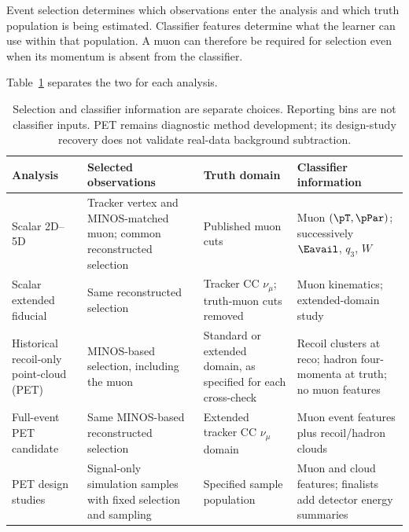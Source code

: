 Event selection determines which observations enter the analysis and which truth population is being estimated. Classifier features determine what the learner can use within that population. A muon can therefore be required for selection even when its momentum is absent from the classifier.

Table~\ref{tab:selection-features} separates the two for each analysis.

\begin{table}[H]
\caption[Selection and classifier information]{Selection and classifier information are separate choices. Reporting bins are not classifier inputs. PET remains diagnostic method development; its design-study recovery does not validate real-data background subtraction.}
\label{tab:selection-features}
\centering\footnotesize
\begin{tabular}{@{}p{}p{}p{}p{}@{}}
\toprule
Analysis & Selected observations & Truth domain & Classifier information \\
\midrule
Scalar 2D--5D & Tracker vertex and MINOS-matched muon; common reconstructed selection & Published muon cuts & Muon $(\pT,\pPar)$; successively $\Eavail$, $q_3$, $W$ \\
\addlinespace
Scalar extended fiducial & Same reconstructed selection & Tracker CC $\nu_\mu$; truth-muon cuts removed & Muon kinematics; extended-domain study \\
\addlinespace
Historical recoil-only point-cloud (PET) & MINOS-based selection, including the muon & Standard or extended domain, as specified for each cross-check & Recoil clusters at reco; hadron four-momenta at truth; no muon features \\
\addlinespace
Full-event PET candidate & Same MINOS-based reconstructed selection & Extended tracker CC $\nu_\mu$ domain & Muon event features plus recoil/hadron clouds \\
\addlinespace
PET design studies & Signal-only simulation samples with fixed selection and sampling & Specified sample population & Muon and cloud features; finalists add detector energy summaries \\
\bottomrule
\end{tabular}
\end{table}

